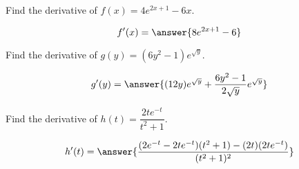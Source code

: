 \documentclass{ximera}
\author{Bobby Ramsey}
\begin{document}
\begin{exercise}
	Find the derivative of $\displaystyle f(x) = 4e^{2x+1}-6x$.
	
	\[ f'(x) = \answer{8e^{2x+1}-6} \]
\end{exercise}

\begin{exercise}
	Find the derivative of $\displaystyle g(y) = (6y^2-1)e^{\sqrt{y}}$.

	\[ g'(y) = \answer{(12y)e^{\sqrt{y}} +\frac{6y^2-1}{2\sqrt{y}}e^{\sqrt{y}}  }\]
\end{exercise}

\begin{exercise}
	Find the derivative of $\displaystyle h(t) = \dfrac{2te^{-t}}{t^2+1}$.
	
	\[ h'(t) = \answer{ \frac{(2e^{-t}-2te^{-t})(t^2+1)-(2t)(2te^{-t})}{(t^2+1)^2}} \]
\end{exercise}
\end{document}
